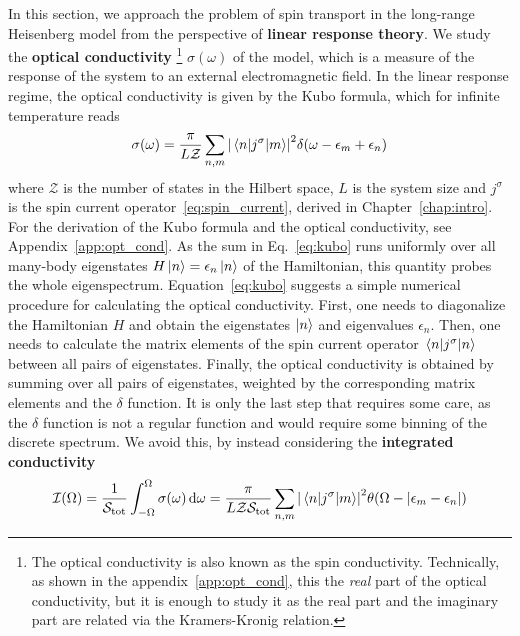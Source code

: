 In this section, we approach the problem of spin transport in the long-range Heisenberg model from the
perspective of \textbf{linear response theory}. We study the \textbf{optical conductivity}
\footnote{The optical conductivity is also known as the spin conductivity. Technically, as shown in the appendix~\ref{app:opt_cond},
this the \textit{real} part of the optical conductivity, but it is enough to study it as the real part and the imaginary part
are related via the Kramers-Kronig relation.} \(\sigma(\omega)\) of the model,
which is a measure of the response of the system to an external electromagnetic field.
In the linear response regime, the optical conductivity is given by the Kubo formula, which
for infinite temperature reads
\begin{equation}
  \sigma(\omega) = \frac{\pi}{L \mathcal{Z}} \sum_{n,m} \abs{\mel{n}{j^{\sigma}}{m}}^2 \delta(\omega - \epsilon_m + \epsilon_n)
  \label{eq:kubo}
\end{equation}
where \(\mathcal{Z}\) is the number of states in the Hilbert space, \(L\) is the system size and \(j^{\sigma}\) is the spin
current operator~\eqref{eq:spin_current}, derived in Chapter~\ref{chap:intro}.
For the derivation of the Kubo formula and the optical conductivity, see Appendix~\ref{app:opt_cond}.
As the sum in Eq.~\eqref{eq:kubo} runs
uniformly over all many-body eigenstates \(H \ket{n} = \epsilon_n \ket{n}\) of the Hamiltonian, this quantity
probes the whole eigenspectrum. Equation~\ref {eq:kubo} suggests a simple numerical procedure for calculating
the optical conductivity. First, one needs to diagonalize the Hamiltonian \(H\) and obtain the eigenstates
\(\ket{n}\) and eigenvalues \(\epsilon_n\). Then, one needs to calculate the matrix elements of the spin current operator
\(\mel{n}{j^{\sigma}}{n}\) between all pairs of eigenstates. Finally, the optical conductivity is obtained by
summing over all pairs of eigenstates, weighted by the corresponding matrix elements and the \(\delta\) function.
It is only the last step that requires some care, as the \(\delta\) function is not a regular function and
would require some binning of the discrete spectrum. We avoid this, by instead considering the
\textbf{integrated conductivity}
\begin{equation}
  \mathcal{I}(\Omega) = \frac{1}{\mathcal{S}_{\mathrm{tot}}} \int_{-\Omega}^{\Omega} \sigma(\omega) \dd{\omega} =
  \frac{\pi}{L \mathcal{Z} \mathcal{S}_{\mathrm{tot}}} \sum_{n,m} \abs{\mel{n}{j^{\sigma}}{m}}^2 \theta(\Omega- \abs{\epsilon_m - \epsilon_n})
  \label{eq:integrated_conductivity}
\end{equation}
